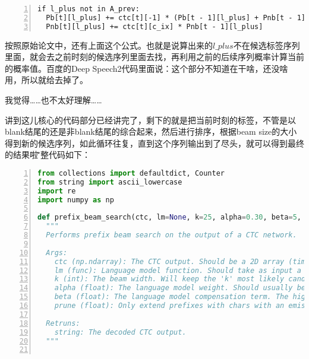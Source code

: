 {{\begin{lstlisting}[language = shell, numbers=left, 
         numberstyle=\tiny,keywordstyle=\color{blue!70},
         commentstyle=\color{red!50!green!50!blue!50},frame=shadowbox,
         rulesepcolor=\color{red!20!green!20!blue!20},basicstyle=\ttfamily]
if l_plus not in A_prev:
  Pb[t][l_plus] += ctc[t][-1] * (Pb[t - 1][l_plus] + Pnb[t - 1][l_plus])
  Pnb[t][l_plus] += ctc[t][c_ix] * Pnb[t - 1][l_plus]
\end{lstlisting}

按照原始论文中，还有上面这个公式。也就是说算出来的$l\_plus$不在候选标签序列里面，就会去之前时刻的候选序列里面去找，再利用之前的后续序列概率计算当前的概率值。百度的Deep Speech2代码里面说：这个部分不知道在干啥，还没啥用，所以就给去掉了。

我觉得……也不太好理解……

讲到这儿核心的代码部分已经讲完了，剩下的就是把当前时刻的标签，不管是以blank结尾的还是非blank结尾的综合起来，然后进行排序，根据beam size的大小得到新的候选序列，如此循环往复，直到这个序列输出到了尽头，就可以得到最终的结果啦\~\~\~

完整代码如下：

\begin{lstlisting}[language = python, numbers=left, 
         numberstyle=\tiny,keywordstyle=\color{blue!70},
         commentstyle=\color{red!50!green!50!blue!50},frame=shadowbox,
         rulesepcolor=\color{red!20!green!20!blue!20},basicstyle=\ttfamily]
from collections import defaultdict, Counter
from string import ascii_lowercase
import re
import numpy as np

def prefix_beam_search(ctc, lm=None, k=25, alpha=0.30, beta=5, prune=0.001):
  """
  Performs prefix beam search on the output of a CTC network.

  Args:
    ctc (np.ndarray): The CTC output. Should be a 2D array (timesteps x alphabet_size)
    lm (func): Language model function. Should take as input a string and output a probability.
    k (int): The beam width. Will keep the 'k' most likely candidates at each timestep.
    alpha (float): The language model weight. Should usually be between 0 and 1.
    beta (float): The language model compensation term. The higher the 'alpha', the higher the 'beta'.
    prune (float): Only extend prefixes with chars with an emission probability higher than 'prune'.

  Retruns:
    string: The decoded CTC output.
  """


\end{lstlisting}}}
